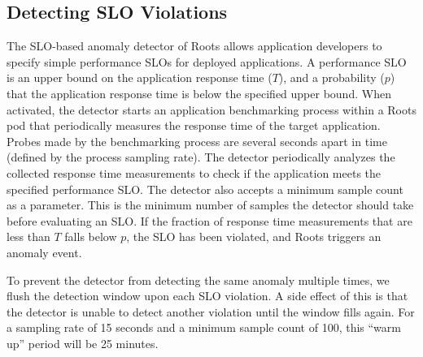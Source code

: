 \subsection{Detecting SLO Violations}

The SLO-based anomaly detector of Roots
allows application developers to specify simple performance SLOs for deployed applications. A
performance SLO is an upper bound on the application response time ($T$), and a probability ($p$)
that the application response time is below the specified upper bound. 
When activated, the detector starts an application benchmarking process within a Roots pod
that periodically measures the response time of the target application. Probes made by the benchmarking 
process are several seconds apart in time (defined by the process sampling rate).
The detector periodically
analyzes the collected response time measurements to check if the application meets the specified performance
SLO. The detector also accepts a minimum sample count as a parameter. This is the minimum number of 
samples the detector should take before evaluating an SLO.  If the fraction of response time measurements
that are
less than $T$ falls below $p$, the SLO has been violated, and Roots triggers an anomaly event.

To prevent the detector from detecting the same anomaly multiple times, we flush
the detection window upon each SLO violation. A side effect of this is that 
the detector is unable to detect
another violation until the window fills again.
For a sampling rate of 15 seconds and a minimum
sample count of 100, this ``warm up'' period will be 25 minutes.

